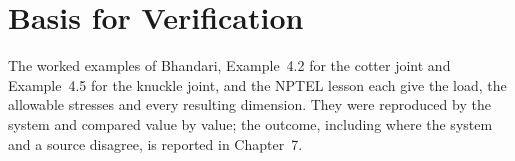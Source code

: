 \section{Basis for Verification}
The worked examples of Bhandari, Example~4.2 for the cotter joint and Example~4.5 for the knuckle joint, and the NPTEL lesson each give the load, the allowable stresses and every resulting dimension. They were reproduced by the system and compared value by value; the outcome, including where the system and a source disagree, is reported in Chapter~7.

